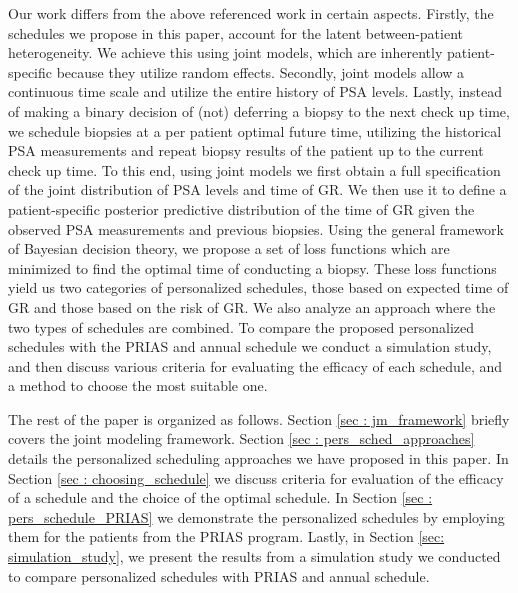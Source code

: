 Our work differs from the above referenced work in certain aspects. Firstly, the schedules we propose in this paper, account for the latent between-patient heterogeneity. We achieve this using joint models, which are inherently patient-specific because they utilize random effects. Secondly, joint models allow a continuous time scale and utilize the entire history of PSA levels. Lastly, instead of making a binary decision of (not) deferring a biopsy to the next check up time, we schedule biopsies at a per patient optimal future time, utilizing the historical PSA measurements and repeat biopsy results of the patient up to the current check up time. To this end, using joint models we first obtain a full specification of the joint distribution of PSA levels and time of GR. We then use it to define a patient-specific posterior predictive distribution of the time of GR given the observed PSA measurements and previous biopsies. Using the general framework of Bayesian decision theory, we propose a set of loss functions which are minimized to find the optimal time of conducting a biopsy. These loss functions yield us two categories of personalized schedules, those based on expected time of GR and those based on the risk of GR. We also analyze an approach where the two types of schedules are combined. To compare the proposed personalized schedules with the PRIAS and annual schedule we conduct a simulation study, and then discuss various criteria for evaluating the efficacy of each schedule, and a method to choose the most suitable one.

The rest of the paper is organized as follows. Section \ref{sec : jm_framework} briefly covers the joint modeling framework. Section \ref{sec : pers_sched_approaches} details the personalized scheduling approaches we have proposed in this paper. In Section \ref{sec : choosing_schedule} we discuss criteria for evaluation of the efficacy of a schedule and the choice of the optimal schedule. In Section \ref{sec : pers_schedule_PRIAS} we demonstrate the personalized schedules by employing them for the patients from the PRIAS program. Lastly, in Section \ref{sec: simulation_study}, we present the results from a simulation study we conducted to compare personalized schedules with PRIAS and annual schedule.